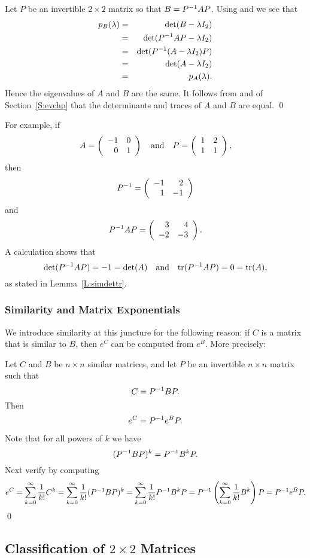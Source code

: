 Let $P$ be an invertible $2\times 2$ matrix so that $B=P^{-1} AP$.
Using  and  we see that
\begin{eqnarray*}
p_B(\lambda) & = & \det(B-\lambda I_2) \\
 & = & \det(P^{-1} AP-\lambda I_2) \\
& = & \det(P^{-1}(A-\lambda I_2)P) \\
& = & \det(A-\lambda I_2) \\
& = & p_A(\lambda).
\end{eqnarray*}
Hence the eigenvalues of $A$ and $B$ are the same.  It follows
from  and  of Section~\ref{S:evchp}
that the determinants and traces of $A$ and $B$ are equal.   \qed

For example, if
\[
A = \left(\begin{array}{rr} -1 & 0\\ 0 &1\end{array}\right) \quad\mbox{and}\quad  P = \left(\begin{array}{rr} 1 & 2\\ 1 &1\end{array}\right),
\]
then
\[
P^{-1} = \left(\begin{array}{rr} -1 & 2\\ 1 &-1\end{array}\right)
\]
and
\[
P^{-1} AP = \left(\begin{array}{rr} 3 & 4\\ -2 &-3\end{array}\right).
\]
A calculation shows that
\[
\det(P^{-1} AP)=-1=\det(A) \quad\mbox{and}\quad {\rm tr}(P^{-1} AP)=0={\rm tr}(A),
\]
as stated in Lemma~\ref{L:simdettr}.


\subsubsection*{Similarity and Matrix Exponentials}

We introduce similarity at this juncture for the following reason:
if $C$ is a matrix that is similar to $B$, then $e^C$ can be computed
from $e^B$.  More precisely:

\begin{lemma} \label{L:similarexp}
Let $C$ and $B$ be $n\times n$ similar matrices, and let $P$ be
an invertible $n\times n$ matrix such that
\[
C=P^{-1} BP.
\]
Then
\begin{equation}  \label{e:similarexp}
e^C = P^{-1} e^BP.
\end{equation}
\end{lemma}  

\proof Note that for all powers of $k$ we have
\[
(P^{-1} BP)^k = P^{-1} B^kP.
\]
Next verify  by computing
\[
e^C =\sum^{\infty}_{k=0} \frac{1}{k!}C^k
 =  \sum^{\infty}_{k=0} \frac{1}{k!}(P^{-1} BP)^k
=  \sum^{\infty}_{k=0} \frac{1}{k!}P^{-1} B^kP
= P^{-1}\left(\sum^{\infty}_{k=0} \frac{1}{k!}B^k\right)P
= P^{-1} e^B P.
\]
\qed


\subsection*{Classification of $2\times 2$ Matrices}

